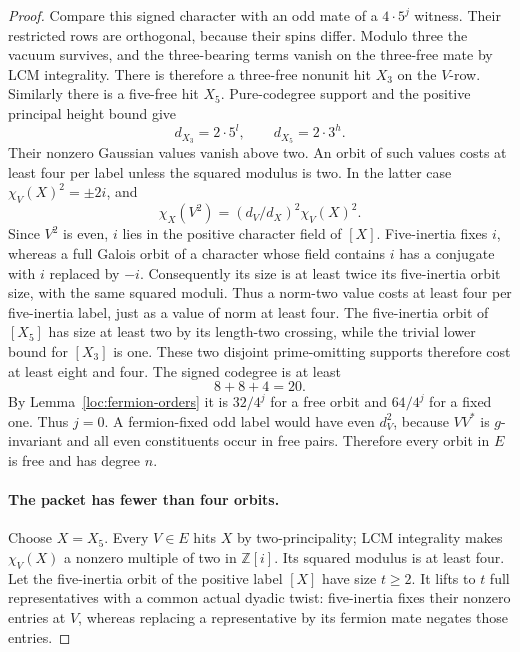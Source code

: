 \documentclass[11pt,a4paper]{article}
\numberwithin{equation}{section}
\begin{document}
\begin{proof}
Compare this signed character with an odd mate of a
$4\cdot5^j$ witness. Their restricted rows are orthogonal,
because their spins differ. Modulo three the vacuum survives,
and the three-bearing terms vanish on the three-free mate by
LCM integrality. There is therefore a three-free nonunit hit
$X_3$ on the $V$-row. Similarly there is a five-free hit $X_5$.
Pure-codegree support and the positive principal height bound give
\[
                     d_{X_3}=2\cdot5^l,
                     \qquad d_{X_5}=2\cdot3^h.
\]
Their nonzero Gaussian values vanish above two. An orbit of such
values costs at least four per label unless the squared modulus
is two. In the latter case $\chi_V(X)^2=\pm2i$, and
\[
                 \chi_X(V^2)=(d_V/d_X)^2\chi_V(X)^2.
\]
Since $V^2$ is even, $i$ lies in the positive character field of
$[X]$. Five-inertia fixes $i$, whereas a full Galois orbit of a character
whose field contains $i$ has a conjugate with $i$ replaced by $-i$.
Consequently its size is at least twice its five-inertia orbit size,
with the same squared moduli. Thus a norm-two value costs at least
four per five-inertia label, just as a value of norm at least four.
The five-inertia orbit of
$[X_5]$ has size at least two by its length-two crossing, while
the trivial lower bound for $[X_3]$ is one. These two disjoint
prime-omitting supports therefore cost at least eight and four.
The signed codegree is at least
\[
                               8+8+4=20.
\]
By Lemma~\ref{loc:fermion-orders} it is $32/4^j$ for a free
orbit and $64/4^j$ for a fixed one. Thus $j=0$.
A fermion-fixed odd label would have even $d_V^2$, because
$VV^*$ is $g$-invariant and all even constituents occur in free
pairs. Therefore every orbit in $E$ is free and has degree $n$.

\paragraph{The packet has fewer than four orbits.}
Choose $X=X_5$. Every $V\in E$ hits $X$ by two-principality;
LCM integrality makes $\chi_V(X)$ a nonzero multiple of two in
$\mathbb Z[i]$. Its squared modulus is at least four.
Let the five-inertia orbit of the positive label $[X]$ have
size $t\ge2$. It lifts to $t$ full representatives with a common
actual dyadic twist: five-inertia fixes their nonzero entries at
$V$, whereas replacing a representative by its fermion mate
negates those entries.


\end{proof}
\end{document}
